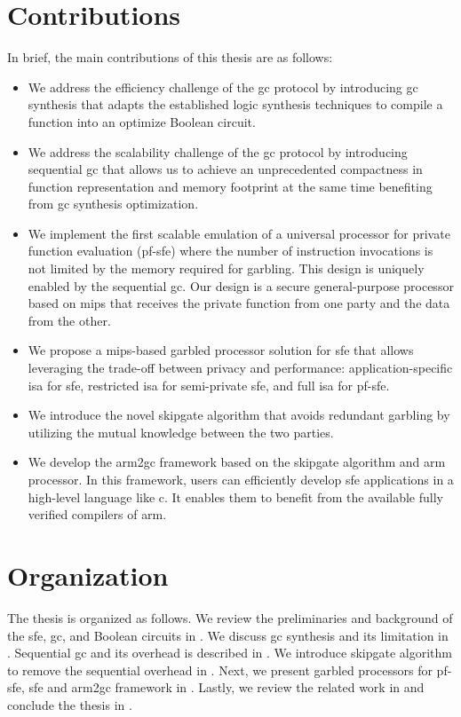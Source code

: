 \section{Contributions}
In brief, the main contributions of this thesis are as follows:
\begin{itemize}
  \item
  We address the efficiency challenge of the gc protocol by introducing \acrshort{gc} synthesis that adapts the established logic synthesis techniques to compile a function into an optimize Boolean circuit.

  \item
  We address the scalability challenge of the \acrshort{gc} protocol by introducing sequential \acrshort{gc} that allows us to achieve an unprecedented compactness in function representation and memory footprint at the same time benefiting from \acrshort{gc} synthesis optimization.

  \item
  We implement the first scalable emulation of a universal processor for private function evaluation (\acrshort{pf-sfe}) where the number of instruction invocations is not limited by the memory required for garbling.
  This design is uniquely enabled by the sequential \acrshort{gc}.
  Our design is a secure general-purpose processor based on \gls{mips} that receives the private function from one party and the data from the other.

  \item
  We propose a \gls{mips}-based garbled processor solution for \acrshort{sfe} that allows leveraging the trade-off between privacy and performance: application-specific \acrshort{isa} for \acrshort{sfe}, restricted \acrshort{isa} for semi-private \acrshort{sfe}, and full \acrshort{isa} for \acrshort{pf-sfe}.

  \item We introduce the novel \gls{skipgate} algorithm that avoids redundant garbling by utilizing the mutual knowledge between the two parties.

  \item
  We develop the \gls{arm2gc} framework based on the \gls{skipgate} algorithm and \gls{arm} processor.
  In this framework, users can efficiently develop \acrshort{sfe} applications in a high-level language like \gls{c}.
  It enables them to benefit from the available fully verified compilers of \gls{arm}.
\end{itemize}

\section{Organization}
The thesis is organized as follows.
We review the preliminaries and background of the \acrshort{sfe}, \acrshort{gc}, and Boolean circuits in .
We discuss \acrshort{gc} synthesis and its limitation in .
Sequential \acrshort{gc} and its overhead is described in .
We introduce \gls{skipgate} algorithm to remove the sequential overhead in .
Next, we present garbled processors for \acrshort{pf-sfe}, \acrshort{sfe} and \gls{arm2gc} framework in .
Lastly, we review the related work in  and conclude the thesis in .
